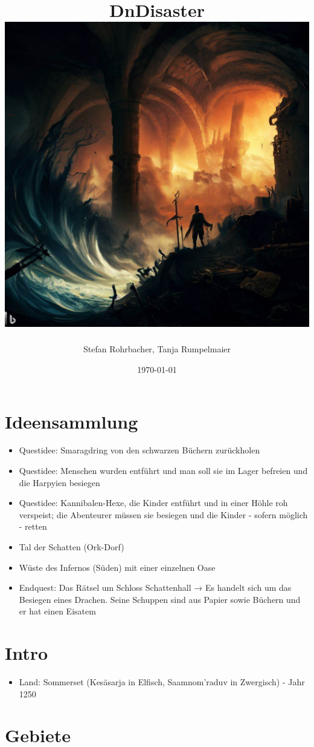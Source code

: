 \documentclass[11pt, twoside]{article}
\author{Stefan Rohrbacher, Tanja Rumpelmaier}
\date{\today}
\title{DnDisaster\\\medskip
\large \includegraphics[width=\linewidth]{wallpaper1.jpeg}}
\begin{document}
\maketitle
\tableofcontents

\newpage

\section{Ideensammlung}
\label{sec:org3d3ccf5}
\begin{itemize}
\item Questidee: Smaragdring von den schwarzen Büchern zurückholen
\item Questidee: Menschen wurden entführt und man soll sie im Lager befreien und die Harpyien besiegen
\item Questidee: Kannibalen-Hexe, die Kinder entführt und in einer Höhle roh verspeist; die Abenteurer müssen sie besiegen und die Kinder - sofern möglich - retten
\item Tal der Schatten (Ork-Dorf)
\item Wüste des Infernos (Süden) mit einer einzelnen Oase
\item Endquest: Das Rätsel um Schloss Schattenhall → Es handelt sich um das Besiegen eines Drachen. Seine Schuppen sind aus Papier sowie Büchern und er hat einen Eisatem
\end{itemize}


\section{Intro}
\label{sec:org328e853}
\begin{itemize}
\item Land: Sommerset (Kesäsarja in Elfisch, Saamnom’raduv in Zwergisch) - Jahr 1250
\end{itemize}

\section{Gebiete}
\label{sec:org00a587f}
\end{document}
